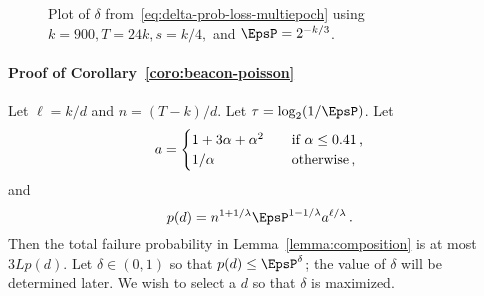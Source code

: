 \begin{figure}
  \caption{Plot of $\delta$ from~\eqref{eq:delta-prob-loss-multiepoch} using $k = 900, T = 24k, s = k/4,$ and $\EpsP = 2^{-k/3}$.}
  \label{fig:poisson-beacon}
\end{figure}




\newcommand{\dMin}{d_\mathrm{min}}
\newcommand{\dMax}{d_\mathrm{max}}

\paragraph{Proof of Corollary~\ref{coro:beacon-poisson}}

	Let $\ell = k/d$ and $n = (T - k)/d$. 
	Let $\tau = \log_2(1/\EpsP)$. 
	Let 
	$$
    a = \begin{cases}
        1 + 3 \alpha + \alpha^2 &\quad\text{if $\alpha \leq 0.41$\,,} \\
        1/\alpha &\quad\text{otherwise\,,}
    \end{cases}
	$$
	and 
	$$
		p(d) = n^{1+1/\lambda} \EpsP^{1 - 1/\lambda} a^{\ell/\lambda}
		\,.
	$$
	Then the total failure probability in Lemma~\ref{lemma:composition} is at most $3 L p(d)$.	
	Let $\delta \in (0, 1)$ so that $p(d) \leq \EpsP^\delta$; 
	the value of $\delta$ will be determined later. 
	We wish to select a $d$ so that $\delta$ is maximized.

